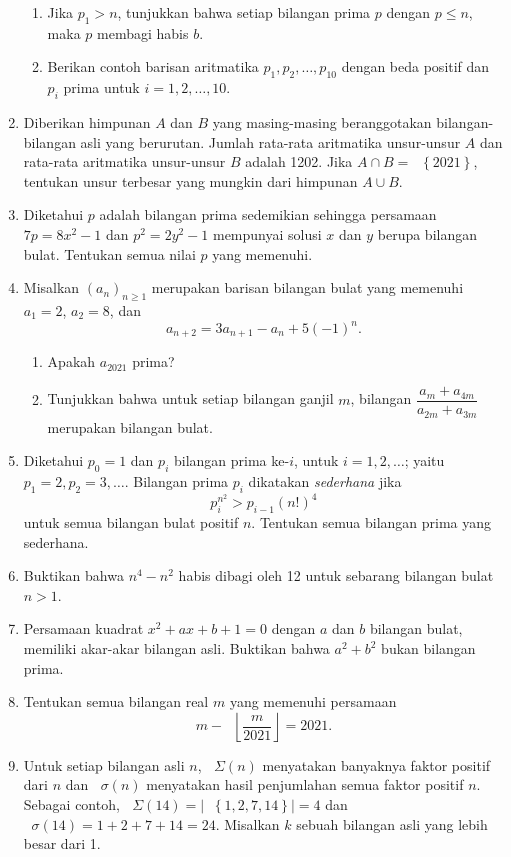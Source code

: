 \documentclass[12pt]{article}
\newcommand*\lrbr[1]{\mathop{}\!\left\lbrace#1\right\rbrace}
\newcommand*\floor[1]{\mathop{}\!\left\lfloor{#1}\right\rfloor}
\newcommand*\func[2]{\mathop{}\!{#1}{\left({#2}\right)}}
\begin{document}
\begin{enumerate}[leftmargin=*]
		\begin{enumerate}
			\item Jika $ p_{1} > n $, tunjukkan bahwa setiap bilangan prima $ p $ dengan $ p \leq n $, maka $ p $ membagi habis $ b $.
			\item Berikan contoh barisan aritmatika $ p_{1}, p_{2}, \dots, p_{10} $ dengan beda positif dan $ p_{i} $ prima untuk $ i = 1, 2, \dots, 10 $.
		\end{enumerate}
		\item Diberikan himpunan $ A $ dan $ B $ yang masing-masing beranggotakan bilangan-bilangan asli yang berurutan. Jumlah rata-rata aritmatika unsur-unsur $ A $ dan rata-rata aritmatika unsur-unsur $ B $ adalah 1202. Jika $ A \cap B = \lrbr{2021} $, tentukan unsur terbesar yang mungkin dari himpunan $ A \cup B $.
		\item Diketahui $ p $ adalah bilangan prima sedemikian sehingga persamaan $ 7p = 8x^{2} - 1 $ dan $ p^{2} = 2y^{2} - 1 $ mempunyai solusi $ x $ dan $ y $ berupa bilangan bulat. Tentukan semua nilai $ p $ yang memenuhi.
		\item Misalkan $ \left(a_{n}\right)_{n \geq 1} $ merupakan barisan bilangan bulat yang memenuhi $ a_{1} = 2 $, $ a_{2} = 8 $, dan
		\[ a_{n + 2} = 3a_{n + 1} - a_{n} + 5\left(-1\right)^{n}. \]
		\begin{enumerate}
			\item Apakah $ a_{2021} $ prima?
			\item Tunjukkan bahwa untuk setiap bilangan ganjil $ m $, bilangan $ \dfrac{a_{m} + a_{4m}}{a_{2m} + a_{3m}} $ merupakan bilangan bulat.
		\end{enumerate}
		\item Diketahui $ p_{0} = 1 $ dan $ p_{i} $ bilangan prima ke-$ i $, untuk $ i = 1, 2, \dots $; yaitu $ p_{1} = 2, p_{2} = 3, \dots $. Bilangan prima $ p_{i} $ dikatakan \textit{sederhana} jika
		\[ p_{i}^{n^{2}} > p_{i - 1}\left(n!\right)^{4} \]
		untuk semua bilangan bulat positif $ n $. Tentukan semua bilangan prima yang sederhana.
		\item Buktikan bahwa $ n^{4} - n^{2} $ habis dibagi oleh 12 untuk sebarang bilangan bulat $ n > 1 $.
		\item Persamaan kuadrat $ x^{2} + ax + b + 1 = 0 $ dengan $ a $ dan $ b $ bilangan bulat, memiliki akar-akar bilangan asli. Buktikan bahwa $ a^{2} + b^{2} $ bukan bilangan prima.
		\item Tentukan semua bilangan real $ m $ yang memenuhi persamaan
		\[ m - \floor{\frac{m}{2021}} = 2021. \]
		\item Untuk setiap bilangan asli $ n $, $ \func{\Sigma}{n} $ menyatakan banyaknya faktor positif dari $ n $ dan $ \func{\sigma}{n} $ menyatakan hasil penjumlahan semua faktor positif $ n $. Sebagai contoh, $ \func{\Sigma}{14} = \left|\lrbr{1, 2, 7, 14}\right| = 4 $ dan $ \func{\sigma}{14} = 1 + 2 + 7 + 14 = 24 $. Misalkan $ k $ sebuah bilangan asli yang lebih besar dari 1.

\end{enumerate}
\end{document}
